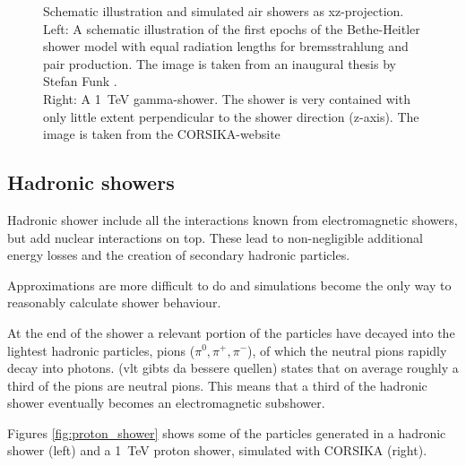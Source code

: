 \begin{figure}
\begin{subfigure}{.3\textwidth}
	\end{subfigure}
	\caption{Schematic illustration and simulated air showers as xz-projection. \\
		Left: A schematic illustration of the first epochs of the 
		Bethe-Heitler shower model with equal radiation lengths for
		bremsstrahlung and pair production.
		The image is taken from an inaugural thesis 
		by Stefan Funk \cite{funk_doctor}. \\
		Right: A \SI{1}{\tera\electronvolt} gamma-shower.
		The shower is very contained with only little extent perpendicular 
		to the shower direction (z-axis). The image is taken from 
		the CORSIKA-website \cite{corsika_showers}}
	\label{fig:gamma_shower}
\end{figure}

\subsection{Hadronic showers}
Hadronic shower include all the interactions known from 
electromagnetic showers, but add nuclear interactions on top.
These lead to non-negligible additional energy losses 
and the creation of secondary hadronic particles.

Approximations are more difficult to do and simulations 
become the only way to reasonably calculate shower behaviour.

At the end of the shower a relevant portion of the particles have decayed into the 
lightest hadronic particles, pions ($\pi^0, \pi^+, \pi^-$), of which the neutral pions 
rapidly decay into photons.
\cite{bookap} (vlt gibts da bessere quellen) states that on average
roughly a third of the pions are neutral pions. This means that 
a third of the hadronic shower eventually becomes an electromagnetic
subshower.

Figures \ref{fig:proton_shower}
shows some of the particles generated in a hadronic shower (left)
and a \SI{1}{\tera\electronvolt} proton shower, simulated with CORSIKA (right).


